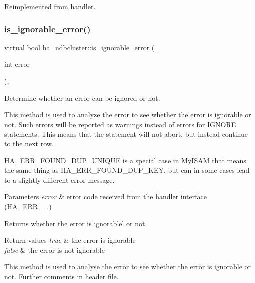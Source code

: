 Reimplemented from \mbox{\hyperlink{classhandler_adda33331aacc500b1b974033cb64a869}{handler}}.

\mbox{\label{classha__ndbcluster_a95efd97175c4d0f4e5548473b6759e31}} 
\subsubsection{\texorpdfstring{is\+\_\+ignorable\+\_\+error()}{is\_ignorable\_error()}}
{\footnotesize\ttfamily virtual bool ha\+\_\+ndbcluster\+::is\+\_\+ignorable\+\_\+error (\begin{DoxyParamCaption}\item[{int}]{error }\end{DoxyParamCaption})\hspace{0.3cm}{\ttfamily [inline]}, {\ttfamily [virtual]}}



Determine whether an error can be ignored or not. 

This method is used to analyze the error to see whether the error is ignorable or not. Such errors will be reported as warnings instead of errors for I\+G\+N\+O\+RE statements. This means that the statement will not abort, but instead continue to the next row.

H\+A\+\_\+\+E\+R\+R\+\_\+\+F\+O\+U\+N\+D\+\_\+\+D\+U\+P\+\_\+\+U\+N\+I\+Q\+UE is a special case in My\+I\+S\+AM that means the same thing as H\+A\+\_\+\+E\+R\+R\+\_\+\+F\+O\+U\+N\+D\+\_\+\+D\+U\+P\+\_\+\+K\+EY, but can in some cases lead to a slightly different error message.


\begin{DoxyParams}{Parameters}
{\em error} & error code received from the handler interface (H\+A\+\_\+\+E\+R\+R\+\_\+...)\\
\hline
\end{DoxyParams}
\begin{DoxyReturn}{Returns}
whether the error is ignorablel or not 
\end{DoxyReturn}

\begin{DoxyRetVals}{Return values}
{\em true} & the error is ignorable \\
\hline
{\em false} & the error is not ignorable\\
\hline
\end{DoxyRetVals}
This method is used to analyse the error to see whether the error is ignorable or not. Further comments in header file. 

